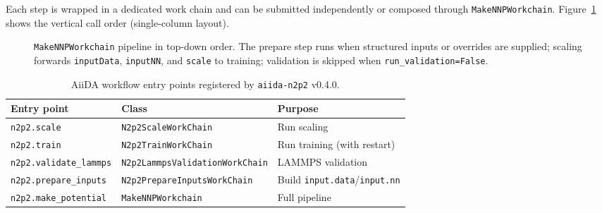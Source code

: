 Each step is wrapped in a dedicated work chain and can be submitted independently or
composed through \texttt{MakeNNPWorkchain}.
Figure~\ref{fig:make-nnp-flow} shows the vertical call order (single-column layout).

\begin{figure}[htbp]
  \centering
  \caption{%
    \texttt{MakeNNPWorkchain} pipeline in top-down order.
    The prepare step runs when structured inputs or overrides are supplied;
    scaling forwards \texttt{inputData}, \texttt{inputNN}, and \texttt{scale} to training;
    validation is skipped when \texttt{run\_validation=False}.}
  \label{fig:make-nnp-flow}
\end{figure}

\begin{table}[htbp]
  \centering
  \caption{AiiDA workflow entry points registered by \texttt{aiida-n2p2} v0.4.0.}
  \label{tab:n2p2-workflows}
  \begin{tabular}{lll}
    \toprule
    Entry point & Class & Purpose \\
    \midrule
    \texttt{n2p2.scale}            & \texttt{N2p2ScaleWorkChain}            & Run scaling \\
    \texttt{n2p2.train}            & \texttt{N2p2TrainWorkChain}            & Run training (with restart) \\
    \texttt{n2p2.validate\_lammps} & \texttt{N2p2LammpsValidationWorkChain} & LAMMPS validation \\
    \texttt{n2p2.prepare\_inputs}  & \texttt{N2p2PrepareInputsWorkChain}    & Build \texttt{input.data}/\texttt{input.nn} \\
    \texttt{n2p2.make\_potential}  & \texttt{MakeNNPWorkchain}              & Full pipeline \\
    \bottomrule
  \end{tabular}
\end{table}

